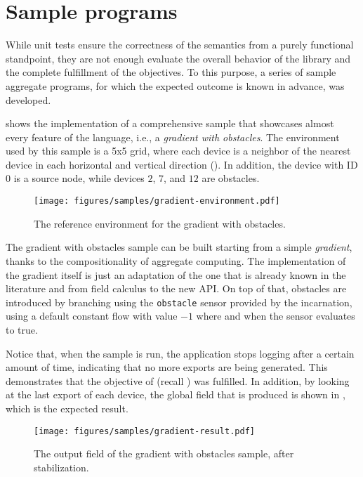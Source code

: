 \section{Sample programs}

While unit tests ensure the correctness of the semantics from a purely functional standpoint, they are not enough evaluate the overall behavior of the library and the complete fulfillment of the objectives.
%
To this purpose, a series of sample aggregate programs, for which the expected outcome is known in advance, was developed.

 shows the implementation of a comprehensive sample that showcases almost every feature of the language, i.e., a \textit{gradient with obstacles}.
%
The environment used by this sample is a 5x5 grid, where each device is a neighbor of the nearest device in each horizontal and vertical direction ().
%
In addition, the device with ID $0$ is a source node, while devices $2$, $7$, and $12$ are obstacles.
%
\begin{figure}
    \centering
    \texttt{[image: figures/samples/gradient-environment.pdf]}
    \caption{The reference environment for the gradient with obstacles.}
    \label{fig:gradient-environment}
\end{figure}
%


The gradient with obstacles sample can be built starting from a simple \textit{gradient}, thanks to the compositionality of aggregate computing.
%
The implementation of the gradient itself is just an adaptation of the one that is already known in the literature and from field calculus to the new API.
%
On top of that, obstacles are introduced by branching using the \texttt{obstacle} sensor provided by the incarnation, using a default constant flow with value $-1$ where and when the sensor evaluates to true.

Notice that, when the sample is run, the application stops logging after a certain amount of time, indicating that no more exports are being generated.
%
This demonstrates that the objective of  (recall ) was fulfilled.
%
In addition, by looking at the last export of each device, the global field that is produced is shown in , which is the expected result.
%
\begin{figure}
    \centering
    \texttt{[image: figures/samples/gradient-result.pdf]}
    \caption{The output field of the gradient with obstacles sample, after stabilization.}
    \label{fig:gradient-result}
\end{figure}

